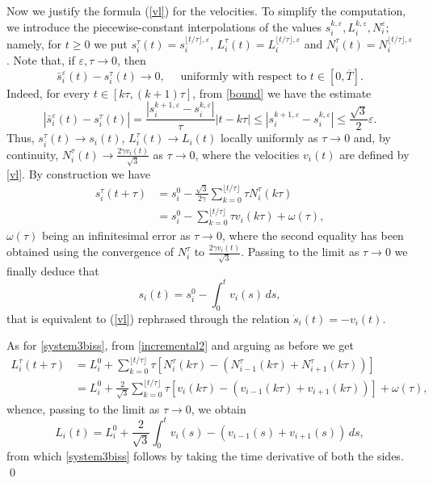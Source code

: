 \documentclass{interact}
\numberwithin{equation}{section}
\theoremstyle{definition}
\renewcommand{\epsilon}{\varepsilon}
\begin{document}
Now we justify the formula (\ref{vl}) for the velocities. To simplify the computation, we introduce the piecewise-constant interpolations of the values $s_i^{k,\epsilon},L_i^{k,\epsilon}, N_{i}^{\epsilon}$; namely, for $t\geq 0$ we put $s^\tau_i(t)=s_i^{\lfloor t/\tau\rfloor,\epsilon}$, $L^\tau_i(t)=L_i^{\lfloor t/\tau\rfloor,\epsilon}$ and $N_{i}^\tau(t)=N_{i}^{\lfloor t/\tau\rfloor,\epsilon}$. 
Note that, if $\epsilon,\tau\to0$, then
\begin{equation}
\bar{s}_i^\epsilon(t)-s^\tau_i(t)\to0,\quad \mbox{ uniformly with respect to }t\in[0,\overline{T}].
\end{equation}
Indeed, for every $t\in[k\tau,(k+1)\tau]$, from \eqref{bound} we have the estimate
\begin{equation}
|\bar{s}_i^\epsilon(t)-s^\tau_i(t)|=\frac{|s_i^{k+1,\epsilon}-s_i^{k,\epsilon}|}{\tau}|t-k\tau|\leq|s_i^{k+1,\epsilon}-s_i^{k,\epsilon}|\leq\frac{\sqrt{3}}{2}\epsilon.
\end{equation}
Thus, $s^\tau_i(t)\to s_i(t)$, $L^\tau_i(t)\to L_i(t)$ locally uniformly as $\tau\to0$ and, by continuity, $N_{i}^\tau(t)\to\frac{{2\gamma}v_{i}(t)}{\sqrt3}$ as $\tau\to0$, where the velocities $v_i(t)$ are defined by \eqref{vl}.
By construction we have
\begin{equation*}
\begin{split}
s_i^\tau(t+\tau)&=s_i^0-\frac{\sqrt3}{2\gamma}\sum_{k=0}^{\lfloor t/\tau\rfloor}\tau N_{i}^\tau(k\tau)\\
&=s_i^0-\sum_{k=0}^{\lfloor t/\tau\rfloor}\tau v_{i}(k\tau)+\omega(\tau),
\end{split}
\end{equation*}
$\omega(\tau)$ being an infinitesimal error as $\tau\to0$, where the second equality has been obtained using the convergence of $N_{i}^\tau$ to $\frac{{2\gamma}v_{i}(t)}{\sqrt3}$. Passing to the limit as $\tau\to0$ we finally deduce that
\begin{equation*}
s_i(t)=s_i^0-\int_0^tv_{i}(s)\,ds,
\end{equation*}
that is equivalent to (\ref{vl}) rephrased through the relation $\dot{s}_i(t)=-v_{i}(t)$.

As for \eqref{system3biss}, from \eqref{incremental2} and arguing as before we get
\begin{equation*}
\begin{split}
L_i^\tau(t+\tau)&=L_i^0+\sum_{k=0}^{\lfloor t/\tau\rfloor}\tau [N_{i}^\tau(k\tau)-(N_{i-1}^\tau(k\tau)+N_{i+1}^\tau(k\tau))]\\
&=L_i^0+\frac{2}{\sqrt{3}}\sum_{k=0}^{\lfloor t/\tau\rfloor}\tau [v_{i}(k\tau)-(v_{i-1}(k\tau)+v_{i+1}(k\tau))]+\omega(\tau),
\end{split}
\end{equation*}
whence, passing to the limit as $\tau\to0$, we obtain
\begin{equation*}
L_i(t)=L_i^0+\frac{2}{\sqrt{3}}\int_0^t v_i(s)-(v_{i-1}(s)+v_{i+1}(s))\,ds,
\end{equation*}
from which \eqref{system3biss} follows by taking the time derivative of both the sides.
\qed
\\
\end{document}

